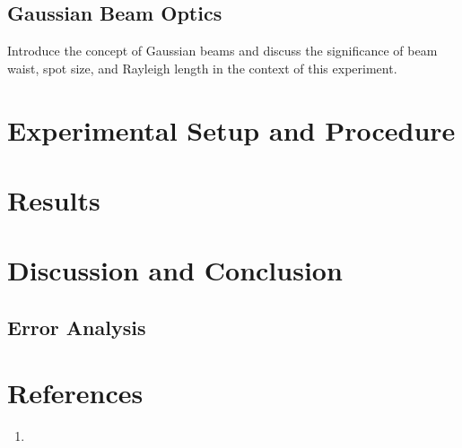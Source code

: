 \documentclass[12pt]{article}
\begin{document}
        \subsection{Gaussian Beam Optics}
        Introduce the concept of Gaussian beams and discuss the significance of beam waist, spot size, and Rayleigh length in the context of this experiment.


\section{Experimental Setup and Procedure}
        
\section{Results}

\section{Discussion and Conclusion}

        \subsection{Error Analysis}



\section{References}
    \begin{enumerate}
        \sloppy
        \item  
    \end{enumerate}
\end{document}

